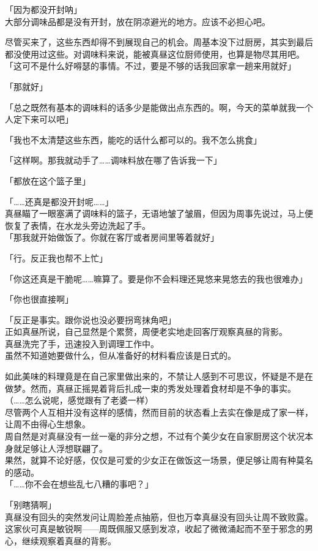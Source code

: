 「因为都没开封呐」\\

大部分调味品都是没有开封，放在阴凉避光的地方。应该不必担心吧。

尽管买来了，这些东西却得不到展现自己的机会。周基本没下过厨房，其实到最后都没使用过这些。对调味料来说，能被真昼这位厨师使用，也算是物尽其用吧。\\

「这可不是什么好嘚瑟的事情。不过，要是不够的话我回家拿一趟来用就好」

「那就好」

「总之既然有基本的调味料的话多少是能做出点东西的。啊，今天的菜单就我一个人定下来可以吧」

「我也不太清楚这些东西，能吃的话什么都可以的。我不怎么挑食」

「这样啊。那我就动手了……调味料放在哪了告诉我一下」

「都放在这个篮子里」

「……还真是都没开封呢……」\\

真昼瞄了一眼塞满了调味料的篮子，无语地皱了皱眉，但因为周事先说过，马上便恢复了表情，在水龙头旁边洗起了手。\\

「那我就开始做饭了。你就在客厅或者房间里等着就好」

「行。反正我也帮不上忙」

「你这还真是干脆呢……嘛算了。要是你不会料理还晃悠来晃悠去的我也很难办」

「你也很直接啊」

「反正是事实。跟你说也没必要拐弯抹角吧」\\

正如真昼所说，自己显然是个累赘，周便老实地走回客厅观察真昼的背影。\\

真昼洗完了手，迅速投入到调理工作中。\\

虽然不知道她要做什么，但从准备好的材料看应该是日式的。

如此美味的料理竟是在自己家里做出来的，不禁让人感到不可思议，怀疑是不是在做梦。然而，真昼正摇晃着背后扎成一束的秀发处理着食材却是不争的事实。\\

（……怎么说呢，感觉跟有了老婆一样）\\

尽管两个人互相并没有这样的感情，然而目前的状态看上去实在像是成了家一样，让周不由得心生想象。\\

周自然是对真昼没有一丝一毫的非分之想，不过有个美少女在自家厨房这个状况本身就足够让人浮想联翩了。\\

果然，就算不论好感，仅仅是可爱的少女正在做饭这一场景，便足够让周有种莫名的感动。\\

「……你不会在想些乱七八糟的事吧？」

「别瞎猜啊」\\

真昼没有回头的突然发问让周脸差点抽筋，但也万幸真昼没有回头让周不致败露。\\

这家伙可真是敏锐啊——周既佩服又感到发凉，收起了微微涌起而不至于邪念的男心，继续观察着真昼的背影。
